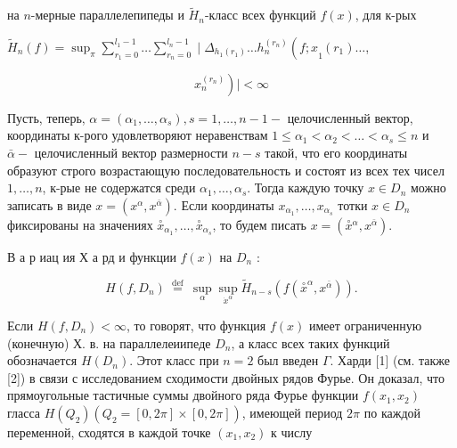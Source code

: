 \documentclass[10pt]{article}
\begin{document}
на $n$-мерные параллелепипеды и $\tilde{H}_{n}$-класс всех функций $f(x)$, для к-рых



$\tilde{H}_{n}(f)=\sup _{\pi} \sum_{r_{1}=0}^{l_{1}-1} \ldots \sum_{r_{n}=0}^{l_{n}-1} \mid \Delta_{h_{1}\left(r_{1}\right)} \ldots h_{n}^{\left(r_{n}\right)}\left(f ; x \underset{1}{ }\left(r_{1}\right) \ldots\right.$,



\[

\left.x_{n}^{\left(r_{n}\right)}\right) \mid<\infty

\]



Пусть, теперь, $\alpha=\left(\alpha_{1}, \ldots, \alpha_{s}\right), s=1, \ldots, n-1-$ целочисленный вектор, координаты к-рого удовлетворяют неравенствам $1 \leqslant \alpha_{1}<\alpha_{2}<\ldots<\alpha_{s} \leqslant n$ и $\bar{\alpha}-$ целочисленный вектор размерности $n-s$ такой, что его координаты образуют строго возрастающую последовательность и состоят из всех тех чисел $1, \ldots, n$, к-рые не содержатся среди $\alpha_{1}, \ldots, \alpha_{s}$. Тогда каждую точку $x \in D_{n}$ можно записать в виде $x=\left(x^{\alpha}, x^{\bar{\alpha}}\right)$. Если координаты $x_{\alpha_{1}}, \ldots, x_{\alpha_{s}}$ тотки $x \in D_{n}$ фиксированы на значениях $\stackrel{\circ}{x}_{\alpha_{1}}, \ldots, \stackrel{\circ}{x}_{\alpha_{s}}$, то будем писать $x=\left(\stackrel{\circ}{x}{ }^{\alpha}, x^{\bar{\alpha}}\right)$.



В а р иац ия Х а рд и функции $f(x)$ на $D_{n}$ :



\[

H\left(f, D_{n}\right) \stackrel{\text { def }}{=} \sup _{\alpha} \sup _{\dot{x}^{\alpha}} \tilde{H}_{n-s}\left(f\left(\stackrel{\circ}{x}^{\alpha}, x^{\bar{\alpha}}\right)\right) .

\]



Если $H\left(f, D_{n}\right)<\infty$, то говорят, что функция $f(x)$ имеет ограниченную (конечную) Х. в. на параллелеиипеде $D_{n}$, а класс всех таких функций обозначается $H\left(D_{n}\right)$. Этот класс при $n=2$ был введен $\Gamma$. Харди [1] (см. также [2]) в связи с исследованием сходимости двойных рядов Фурье. Он доказал, что прямоугольные тастичные суммы двойного ряда Фурье функции $f\left(x_{1}, x_{2}\right)$ гласса $H\left(Q_{2}\right)\left(Q_{2}=[0,2 \pi] \times[0,2 \pi]\right)$, имеющей период $2 \pi$ по каждой переменной, сходятся в каждой точке $\left(x_{1}, x_{2}\right)$ к числу
\end{document}

